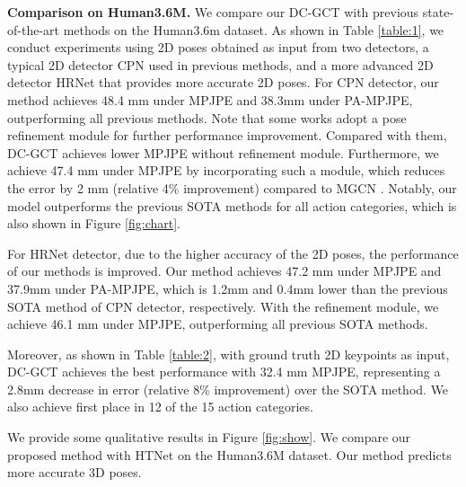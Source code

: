 \documentclass[journal]{IEEEtran}
\begin{document}
{\bf{Comparison on Human3.6M.}} We compare our DC-GCT with previous state-of-the-art methods on the Human3.6m dataset. As shown in Table \ref{table:1}, we conduct experiments using 2D poses obtained as input from two detectors, a typical 2D detector CPN\cite{chen2018cascaded} used in previous methods, and a more advanced 2D detector HRNet\cite{sun2019deep} that provides more accurate 2D poses. For CPN detector, our method achieves 48.4 mm under MPJPE and 38.3mm under PA-MPJPE, outperforming all previous methods. Note that some works \cite{cai2019exploiting,zou2021modulated} adopt a pose refinement module for further performance improvement. Compared with them, DC-GCT achieves lower MPJPE without refinement module. Furthermore, we achieve 47.4 mm under MPJPE by incorporating such a module, which reduces the error by 2 mm (relative 4\% improvement) compared to MGCN \cite{zou2021modulated}. Notably, our model outperforms the previous SOTA methods for all action categories, which is also shown in Figure \ref{fig:chart}. 


For HRNet detector, due to the higher accuracy of the 2D poses, the performance of our methods is improved. Our method achieves 47.2 mm under MPJPE and 37.9mm under PA-MPJPE, which is 1.2mm and 0.4mm lower than the previous SOTA method of CPN detector, respectively. With the refinement module, we achieve 46.1 mm under MPJPE, outperforming all previous SOTA methods.


Moreover, as shown in Table \ref{table:2}, with ground truth 2D keypoints as input, DC-GCT achieves the best performance with 32.4 mm MPJPE, representing a 2.8mm decrease in error (relative 8\% improvement) over the SOTA method. We also achieve first place in 12 of the 15 action categories.

We provide some qualitative results in Figure \ref{fig:show}. We compare our proposed method with HTNet \cite{cai2023htnet} on the Human3.6M dataset. Our method predicts more accurate 3D poses.
\end{document}
